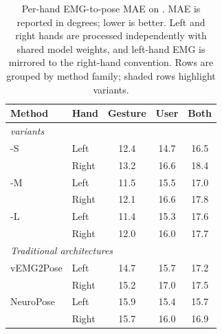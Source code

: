 \begin{table}[h]
\centering
\caption{Per-hand EMG-to-pose MAE on \dataset{}. MAE is reported in degrees; lower is better. Left and right hands are processed independently with shared model weights, and left-hand EMG is mirrored to the right-hand convention. Rows are grouped by method family; shaded rows highlight \model{} variants.}
\label{tab:emg_per_hand}
\footnotesize
\setlength{\tabcolsep}{3.8pt}
\renewcommand{\arraystretch}{1.08}
\begin{tabular}{llccc}
\toprule
Method & Hand & Gesture & User & Both \\
\midrule
\multicolumn{5}{l}{\textit{\model{} variants}} \\
\midrule
\model{}-S & Left & 12.4 & 14.7 & 16.5 \\
 & Right & 13.2 & 16.6 & 18.4 \\
\midrule
\model{}-M & Left & 11.5 & 15.5 & 17.0 \\
 & Right & 12.1 & 16.6 & 17.8 \\
\midrule
\model{}-L & Left & 11.4 & 15.3 & 17.6 \\
 & Right & 12.0 & 16.0 & 17.7 \\
\midrule
\multicolumn{5}{l}{\textit{Traditional architectures}} \\
\midrule
vEMG2Pose & Left & 14.7 & 15.7 & 17.2 \\
 & Right & 15.2 & 17.0 & 17.5 \\
\midrule
NeuroPose & Left & 15.9 & 15.4 & 15.7 \\
 & Right & 15.7 & 16.0 & 16.9 \\
\bottomrule
\end{tabular}
\end{table}
